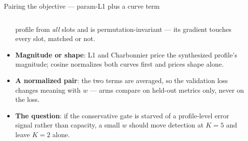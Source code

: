 \documentclass[aspectratio=169,9pt]{beamer}
\begin{document}
\begin{frame}{Pairing the objective --- param-L1 plus a curve term}
\begin{columns}[c]
\begin{column}{0.43\textwidth}
\begin{itemize}
              profile from \emph{all} slots and is permutation-invariant ---
              its gradient touches every slot, matched or not.
        \item \textbf{Magnitude or shape}: L1 and Charbonnier price the
              synthesized profile's magnitude; cosine normalizes both curves
              first and prices shape alone.
        \item \textbf{A normalized pair}: the two terms are averaged, so the
              validation loss changes meaning with $w$ --- arms compare on
              held-out metrics only, never on the loss.
        \item \textbf{The question}: if the conservative gate is starved of a
              profile-level error signal rather than capacity, a small $w$
              should move detection at $K{=}5$ and leave $K{=}2$ alone.
      \end{itemize}
    \end{column}
  \end{columns}
\end{frame}
\end{document}
